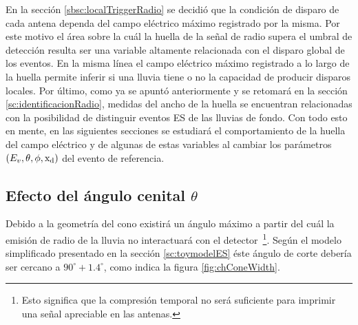 	En la secci\'on \ref{sbsc:localTriggerRadio} se decidi\'o que la condici\'on de disparo de cada antena dependa del campo el\'ectrico m\'aximo registrado por la misma.
	Por este motivo el \'area sobre la cu\'al la huella de la se\~nal de radio supera el umbral de detecci\'on resulta ser una variable altamente relacionada con el disparo global de los eventos.
	En la misma l\'inea el campo el\'ectrico m\'aximo registrado a lo largo de la huella permite inferir si una lluvia tiene o no la capacidad de producir disparos locales.
	Por \'ultimo, como ya se apunt\'o anteriormente y se retomar\'a en la secci\'on \ref{sc:identificacionRadio}, medidas del ancho de la huella se encuentran relacionadas con la posibilidad de distinguir eventos ES de las lluvias de fondo.
	Con todo esto en mente, en las siguientes secciones se estudiar\'a el comportamiento de la huella del campo el\'ectrico y de algunas de estas variables al cambiar los par\'ametros $(E_v,\theta,\phi,{\rm x_d})$ del evento de referencia.
	
	\subsection{Efecto del \'angulo cenital $\theta$}
	\label{sbsc:depThetaRadio}
	
	Debido a la geometr\'ia del cono \cher{} existir\'a un \'angulo m\'aximo a partir del cu\'al la emisi\'on de radio de la lluvia no interactuar\'a con el detector~\footnote{Esto significa que la compresi\'on temporal no ser\'a suficiente para imprimir una se\~nal apreciable en las antenas.}.
	Seg\'un el modelo simplificado presentado en la secci\'on \ref{sc:toymodelES} \'este \'angulo de corte deber\'ia ser cercano a $90^\circ+1.4^\circ$, como indica la figura \ref{fig:chConeWidth}.
	
